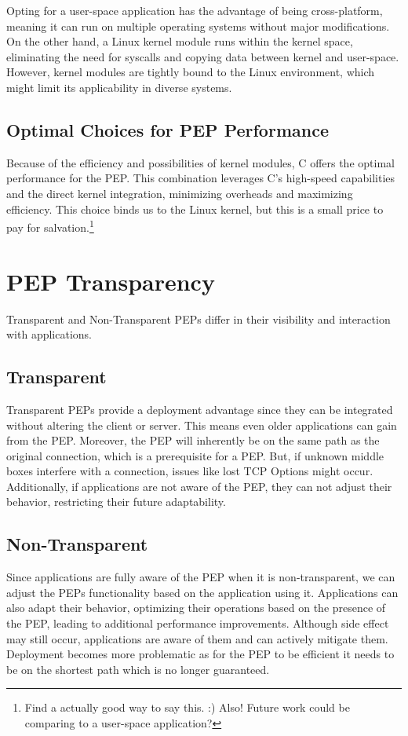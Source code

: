 \documentclass[a4paper,english, 11pt]{report}
\begin{document}
Opting for a user-space application has the advantage of being cross-platform, meaning it can run on multiple operating systems without major modifications. On the other hand, a Linux kernel module runs within the kernel space, eliminating the need for syscalls and copying data between kernel and user-space.  However, kernel modules are tightly bound to the Linux environment, which might limit its applicability in diverse systems.

\subsection{Optimal Choices for PEP Performance}
Because of the efficiency and possibilities of kernel modules, C offers the optimal performance for the PEP. This combination leverages C's high-speed capabilities and the direct kernel integration, minimizing overheads and maximizing efficiency. This choice binds us to the Linux kernel, but this is a small price to pay for salvation.\footnote{Find a actually good way to say this. :) Also! Future work could be comparing to a user-space application? }

\section{PEP Transparency}
Transparent and Non-Transparent PEPs differ in their visibility and interaction with applications. 

\subsection{Transparent}
Transparent PEPs provide a deployment advantage since they can be integrated without altering the client or server. This means even older applications can gain from the PEP. Moreover, the PEP will inherently be on the same path as the original connection, which is a prerequisite for a PEP. But, if unknown middle boxes interfere with a connection, issues like lost TCP Options might occur. Additionally, if applications are not aware of the PEP, they can not adjust their behavior, restricting their future adaptability.

\subsection{Non-Transparent}
Since applications are fully aware of the PEP when it is non-transparent, we can adjust the PEPs functionality based on the application using it. Applications can also adapt their behavior, optimizing their operations based on the presence of the PEP, leading to additional performance improvements. Although side effect may still occur, applications are aware of them and can actively mitigate them. Deployment becomes more problematic as for the PEP to be efficient it needs to be on the shortest path which is no longer guaranteed.
\end{document}
